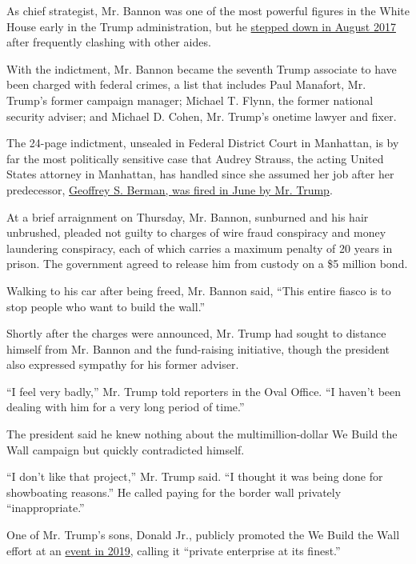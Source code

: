 As chief strategist, Mr. Bannon was one of the most powerful figures in
the White House early in the Trump administration, but he
\href{https://www.nytimes3xbfgragh.onion/2017/08/18/us/politics/steve-bannon-trump-white-house.html}{stepped
down in August 2017} after frequently clashing with other aides.

With the indictment, Mr. Bannon became the seventh Trump associate to
have been charged with federal crimes, a list that includes Paul
Manafort, Mr. Trump's former campaign manager; Michael T. Flynn, the
former national security adviser; and Michael D. Cohen, Mr. Trump's
onetime lawyer and fixer.

The 24-page indictment, unsealed in Federal District Court in Manhattan,
is by far the most politically sensitive case that Audrey Strauss, the
acting United States attorney in Manhattan, has handled since she
assumed her job after her predecessor,
\href{https://www.nytimes3xbfgragh.onion/2020/06/20/nyregion/trump-geoffrey-berman-fired-sdny.html}{Geoffrey
S. Berman, was fired in June by Mr. Trump}.

At a brief arraignment on Thursday, Mr. Bannon, sunburned and his hair
unbrushed, pleaded not guilty to charges of wire fraud conspiracy and
money laundering conspiracy, each of which carries a maximum penalty of
20 years in prison. The government agreed to release him from custody on
a \$5 million bond.

Walking to his car after being freed, Mr. Bannon said, ``This entire
fiasco is to stop people who want to build the wall.''

Shortly after the charges were announced, Mr. Trump had sought to
distance himself from Mr. Bannon and the fund-raising initiative, though
the president also expressed sympathy for his former adviser.

``I feel very badly,'' Mr. Trump told reporters in the Oval Office. ``I
haven't been dealing with him for a very long period of time.''

The president said he knew nothing about the multimillion-dollar We
Build the Wall campaign but quickly contradicted himself.

``I don't like that project,'' Mr. Trump said. ``I thought it was being
done for showboating reasons.'' He called paying for the border wall
privately ``inappropriate.''

One of Mr. Trump's sons, Donald Jr., publicly promoted the We Build the
Wall effort at an
\href{https://thewallsymposium.com/coalition-of-immigration-national-security-and-border-experts-convene-a-crisis-at-the-border-symposium-at-the-wall-directly-on-the-us-mexico-border/}{event
in 2019}, calling it ``private enterprise at its finest.''


